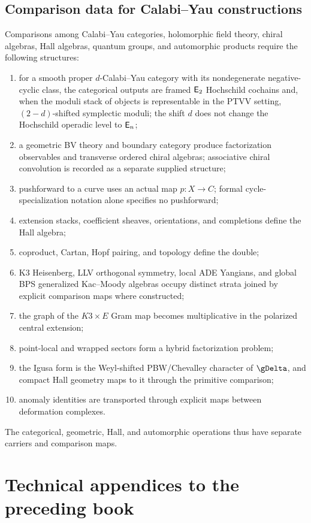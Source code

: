 \chapter{Comparison data for Calabi--Yau constructions}
Comparisons among Calabi--Yau categories, holomorphic field theory, chiral algebras, Hall algebras, quantum groups, and automorphic products require the following structures:
\begin{enumerate}
\item for a smooth proper $d$-Calabi--Yau category with its nondegenerate negative-cyclic class, the categorical outputs are framed $\mathsf E_2$ Hochschild cochains and, when the moduli stack of objects is representable in the PTVV setting, $(2-d)$-shifted symplectic moduli; the shift $d$ does not change the Hochschild operadic level to $\mathsf E_n$;
\item a geometric BV theory and boundary category produce factorization observables and transverse ordered chiral algebras; associative chiral convolution is recorded as a separate supplied structure;
\item pushforward to a curve uses an actual map $p:X\to C$; formal cycle-specialization notation alone specifies no pushforward;
\item extension stacks, coefficient sheaves, orientations, and completions define the Hall algebra;
\item coproduct, Cartan, Hopf pairing, and topology define the double;
\item K3 Heisenberg, LLV orthogonal symmetry, local ADE Yangians, and global BPS generalized Kac--Moody algebras occupy distinct strata joined by explicit comparison maps where constructed;
\item the graph of the $K3\times E$ Gram map becomes multiplicative in the polarized central extension;
\item point-local and wrapped sectors form a hybrid factorization problem;
\item the Igusa form is the Weyl-shifted PBW/Chevalley character of $\gDelta$, and compact Hall geometry maps to it through the primitive comparison;
\item anomaly identities are transported through explicit maps between deformation complexes.
\end{enumerate}
The categorical, geometric, Hall, and automorphic operations thus have separate carriers and comparison maps.

\part{Technical appendices to the preceding book}

